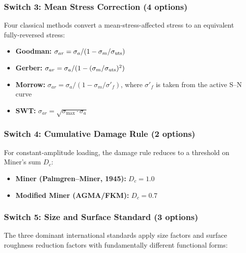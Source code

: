 \documentclass[12pt,a4paper]{article}
\begin{document}
\subsubsection{Switch 3: Mean Stress Correction (4 options)}

Four classical methods convert a mean-stress-affected stress to an
equivalent fully-reversed stress:

\begin{itemize}
  \item \textbf{Goodman:}
        $\sigma_{ar} = \sigma_a / (1 - \sigma_m/\sigma_{\rm uts})$
  \item \textbf{Gerber:}
        $\sigma_{ar} = \sigma_a / (1 - (\sigma_m/\sigma_{\rm uts})^2)$
  \item \textbf{Morrow:}
        $\sigma_{ar} = \sigma_a / (1 - \sigma_m/\sigma'_f)$,
        where $\sigma'_f$ is taken from the active S--N curve
  \item \textbf{SWT:}
        $\sigma_{ar} = \sqrt{\sigma_{\max} \cdot \sigma_a}$
\end{itemize}

\subsubsection{Switch 4: Cumulative Damage Rule (2 options)}

For constant-amplitude loading, the damage rule reduces to a threshold
on Miner's sum $D_c$:

\begin{itemize}
  \item \textbf{Miner (Palmgren--Miner, 1945):} $D_c = 1.0$
  \item \textbf{Modified Miner (AGMA/FKM):} $D_c = 0.7$
\end{itemize}

\subsubsection{Switch 5: Size and Surface Standard (3 options)}

The three dominant international standards apply size factors and surface
roughness reduction factors with fundamentally different functional forms:
\end{document}
